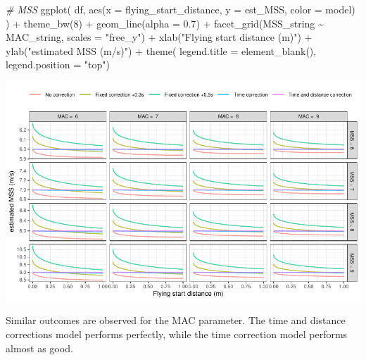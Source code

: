 \documentclass[fleqn,10pt,lineno]{wlpeerj} %
\newenvironment{Shaded}{\begin{snugshade}}{\end{snugshade}}
\newcommand{\AttributeTok}[1]{\textcolor[rgb]{0.77,0.63,0.00}{#1}}
\newcommand{\CommentTok}[1]{\textcolor[rgb]{0.56,0.35,0.01}{\textit{#1}}}
\newcommand{\DecValTok}[1]{\textcolor[rgb]{0.00,0.00,0.81}{#1}}
\newcommand{\FloatTok}[1]{\textcolor[rgb]{0.00,0.00,0.81}{#1}}
\newcommand{\FunctionTok}[1]{\textcolor[rgb]{0.00,0.00,0.00}{#1}}
\newcommand{\NormalTok}[1]{#1}
\newcommand{\SpecialCharTok}[1]{\textcolor[rgb]{0.00,0.00,0.00}{#1}}
\newcommand{\StringTok}[1]{\textcolor[rgb]{0.31,0.60,0.02}{#1}}
\begin{document}
\begin{Shaded}
\begin{Highlighting}[]
\CommentTok{\# MSS}
\FunctionTok{ggplot}\NormalTok{(}
\NormalTok{  df,}
  \FunctionTok{aes}\NormalTok{(}\AttributeTok{x =}\NormalTok{ flying\_start\_distance, }\AttributeTok{y =}\NormalTok{ est\_MSS, }\AttributeTok{color =}\NormalTok{ model)}
\NormalTok{) }\SpecialCharTok{+}
  \FunctionTok{theme\_bw}\NormalTok{(}\DecValTok{8}\NormalTok{) }\SpecialCharTok{+}
  \FunctionTok{geom\_line}\NormalTok{(}\AttributeTok{alpha =} \FloatTok{0.7}\NormalTok{) }\SpecialCharTok{+}
  \FunctionTok{facet\_grid}\NormalTok{(MSS\_string }\SpecialCharTok{\textasciitilde{}}\NormalTok{ MAC\_string, }\AttributeTok{scales =} \StringTok{"free\_y"}\NormalTok{) }\SpecialCharTok{+}
  \FunctionTok{xlab}\NormalTok{(}\StringTok{"Flying start distance (m)"}\NormalTok{) }\SpecialCharTok{+}
  \FunctionTok{ylab}\NormalTok{(}\StringTok{"estimated MSS (m/s)"}\NormalTok{) }\SpecialCharTok{+}
  \FunctionTok{theme}\NormalTok{(}
    \AttributeTok{legend.title =} \FunctionTok{element\_blank}\NormalTok{(),}
    \AttributeTok{legend.position =} \StringTok{"top"}\NormalTok{)}
\end{Highlighting}
\end{Shaded}

\begin{center}\includegraphics[width=1\linewidth]{paper_files/figure-latex/unnamed-chunk-42-1} \end{center}

Similar outcomes are observed for the MAC parameter. The time and distance corrections model performs perfectly, while the time correction model performs almost as good.
\end{document}
